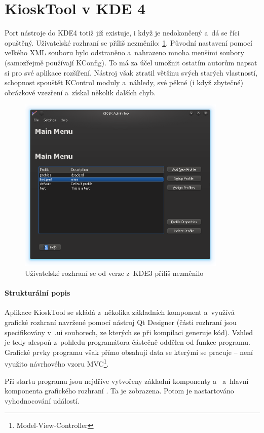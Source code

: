 \section{KioskTool v KDE 4}
Port nástroje do KDE4 totiž již existuje, i když je nedokončený a~dá se říci opuštěný. Uživatelské rozhraní se příliš nezměnilo: \ref{fig:kt4_uvod}. Původní nastavení pomocí velkého XML souboru bylo odstraněno a~nahrazeno mnoha menšími soubory (samozřejmě používají KConfig). To má za účel umožnit ostatím autorům napsat si pro své aplikace rozšíření. Nástroj však ztratil většinu svých starých vlastností, schopnost spouštět KControl moduly a~náhledy, své pěkné (i když zbytečné) obrázkové vzezření a~získal několik dalších chyb.

\begin{figure}[h]
    \centering
    \includegraphics[width=10cm]{obrazky/KioskToolKDE4/kiosktool_kde4.png}
    \caption{Uživatelské rozhraní se od verze z~KDE3 příliš nezměnilo}
    \label{fig:kt4_uvod}
\end{figure}

\paragraph{Strukturální popis}
Aplikace KioskTool se skládá z~několika základních komponent a~využívá grafické rozhraní navržené pomocí nástroj Qt Designer (části rozhraní jsou specifikovány v~.ui souborech, ze kterých se při kompilaci generuje kód). Vzhled je tedy alespoň z~pohledu programátora  částečně oddělen od funkce programu. Grafické prvky programu však přímo obsahují data se kterými se pracuje -- není využito návrhového vzoru MVC\footnote{Model-View-Controller}.

Při startu programu jsou nejdříve vytvořeny základní komponenty  a~ a~hlavní komponenta grafického rozhraní . Ta je zobrazena. Potom je nastartováno vyhodnocování událostí.


